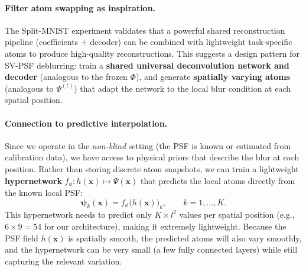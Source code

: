 \documentclass[11pt,letterpaper]{article}
\newcommand{\psivec}{\boldsymbol{\psi}}
\begin{document}
\paragraph{Filter atom swapping as inspiration.}
The Split-MNIST experiment validates that a powerful shared reconstruction
pipeline (coefficients + decoder) can be combined with lightweight
task-specific atoms to produce high-quality reconstructions.  This suggests
a design pattern for SV-PSF deblurring: train a \textbf{shared universal
deconvolution network and decoder} (analogous to the frozen $\Phi$), and
generate \textbf{spatially varying atoms} (analogous to $\Psi^{(t)}$) that
adapt the network to the local blur condition at each spatial position.

\paragraph{Connection to predictive interpolation.}
Since we operate in the \emph{non-blind} setting (the PSF is known or
estimated from calibration data), we have access to physical priors that
describe the blur at each position.  Rather than storing discrete atom
snapshots, we can train a lightweight \textbf{hypernetwork}
$f_\phi : h(\mathbf{x}) \mapsto \Psi(\mathbf{x})$ that predicts the
local atoms directly from the known local PSF:
\begin{equation}
  \psivec_k(\mathbf{x}) = f_\phi\bigl(h(\mathbf{x})\bigr)_k,
  \qquad k = 1, \ldots, K.
\end{equation}
This hypernetwork needs to predict only $K \times l^2$ values per spatial
position (e.g., $6 \times 9 = 54$ for our architecture), making it
extremely lightweight.  Because the PSF field $h(\mathbf{x})$ is spatially
smooth, the predicted atoms will also vary smoothly, and the hypernetwork
can be very small (a few fully connected layers) while still capturing the
relevant variation.
\end{document}

